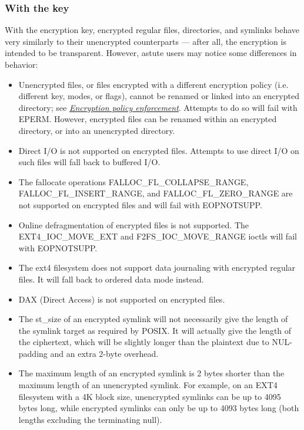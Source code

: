 \documentclass[a4paper,8pt,english]{sphinxmanual}
\begin{document}
\subsubsection{With the key}
\label{filesystems/fscrypt:with-the-key}
With the encryption key, encrypted regular files, directories, and
symlinks behave very similarly to their unencrypted counterparts ---
after all, the encryption is intended to be transparent.  However,
astute users may notice some differences in behavior:
\begin{itemize}
\item {} 
Unencrypted files, or files encrypted with a different encryption
policy (i.e. different key, modes, or flags), cannot be renamed or
linked into an encrypted directory; see {\hyperref[filesystems/fscrypt:encryption\string-policy\string-enforcement]{\emph{Encryption policy
enforcement}}}.  Attempts to do so will fail with EPERM.  However,
encrypted files can be renamed within an encrypted directory, or
into an unencrypted directory.

\item {} 
Direct I/O is not supported on encrypted files.  Attempts to use
direct I/O on such files will fall back to buffered I/O.

\item {} 
The fallocate operations FALLOC\_FL\_COLLAPSE\_RANGE,
FALLOC\_FL\_INSERT\_RANGE, and FALLOC\_FL\_ZERO\_RANGE are not supported
on encrypted files and will fail with EOPNOTSUPP.

\item {} 
Online defragmentation of encrypted files is not supported.  The
EXT4\_IOC\_MOVE\_EXT and F2FS\_IOC\_MOVE\_RANGE ioctls will fail with
EOPNOTSUPP.

\item {} 
The ext4 filesystem does not support data journaling with encrypted
regular files.  It will fall back to ordered data mode instead.

\item {} 
DAX (Direct Access) is not supported on encrypted files.

\item {} 
The st\_size of an encrypted symlink will not necessarily give the
length of the symlink target as required by POSIX.  It will actually
give the length of the ciphertext, which will be slightly longer
than the plaintext due to NUL-padding and an extra 2-byte overhead.

\item {} 
The maximum length of an encrypted symlink is 2 bytes shorter than
the maximum length of an unencrypted symlink.  For example, on an
EXT4 filesystem with a 4K block size, unencrypted symlinks can be up
to 4095 bytes long, while encrypted symlinks can only be up to 4093
bytes long (both lengths excluding the terminating null).

\end{itemize}
\end{document}
